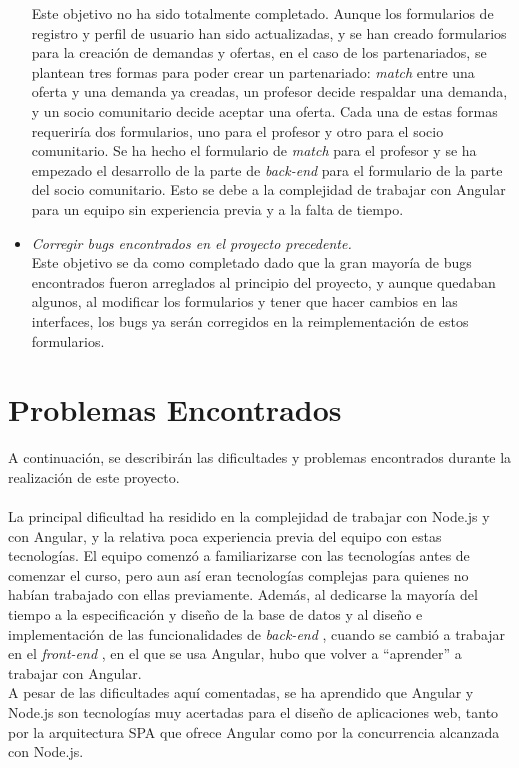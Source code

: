 \documentclass[11pt]{book}
\begin{document}
\begin{itemize}
		Este objetivo no ha sido totalmente completado. Aunque los formularios de registro y perfil de usuario han sido actualizadas, y se han creado formularios para la creación de demandas y ofertas, en el caso de los partenariados, se plantean tres formas para poder crear un partenariado: \emph{match} entre una oferta y una demanda ya creadas, un profesor decide respaldar una demanda, y un socio comunitario decide aceptar una oferta. Cada una de estas formas requeriría dos formularios, uno para el profesor y otro para el socio comunitario. Se ha hecho el formulario de \emph{match} para el profesor y se ha empezado el desarrollo de la parte de \emph{ back-end } para el formulario de la parte del socio comunitario. Esto se debe a la complejidad de trabajar con Angular para un equipo sin experiencia previa y a la falta de tiempo.
		\item \emph{Corregir bugs encontrados en el proyecto precedente.}\\
		Este objetivo se da como completado dado que la gran mayoría de bugs encontrados fueron arreglados al principio del proyecto, y aunque quedaban algunos, al modificar los formularios y tener que hacer cambios en las interfaces, los bugs ya serán corregidos en la reimplementación de estos formularios.
		
	\end{itemize}
	
	\section{Problemas Encontrados}
	A continuación, se describirán las dificultades y problemas encontrados durante la realización de este proyecto. \\\\
	La principal dificultad ha residido en la complejidad de trabajar con Node.js y con Angular, y la relativa poca experiencia previa del equipo con estas tecnologías. El equipo comenzó a familiarizarse con las tecnologías antes de comenzar el curso, pero aun así eran tecnologías complejas para quienes no habían trabajado con ellas previamente. Además, al dedicarse la mayoría del tiempo a la especificación y diseño de la base de datos y al diseño e implementación de las funcionalidades de \emph{ back-end }, cuando se cambió a trabajar en el \emph{ front-end }, en el que se usa Angular, hubo que volver a ``aprender'' a trabajar con Angular.\\
	A pesar de las dificultades aquí comentadas, se ha aprendido que Angular y Node.js son tecnologías muy acertadas para el diseño de aplicaciones web, tanto por la arquitectura SPA que ofrece Angular como por la concurrencia alcanzada con Node.js.
	
\end{document}
